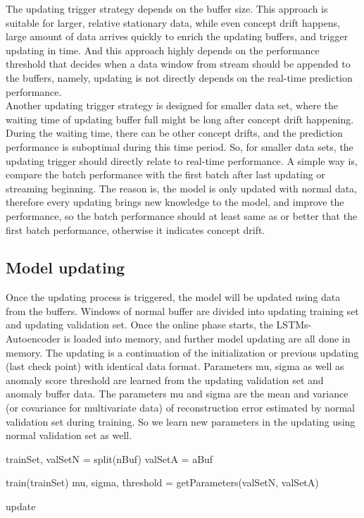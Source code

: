 The updating trigger strategy depends on the buffer size. This approach is suitable for larger, relative stationary data, while even concept drift happens, large amount of data arrives quickly to enrich the updating buffers, and trigger updating in time. And this approach highly depends on the performance threshold that decides when a data window from stream should be appended to the buffers, namely, updating is not directly depends on the real-time prediction performance. \\

Another updating trigger strategy is designed for smaller data set, where the waiting time of updating buffer full might be long after concept drift happening. During the waiting time, there can be other concept drifts, and the prediction performance is suboptimal during this time period. So, for smaller data sets, the updating trigger should directly relate to real-time performance. A simple way is, compare the batch performance with the first batch after last updating or streaming beginning. The reason is, the model is only updated with normal data, therefore every updating brings new knowledge to the model, and improve the performance, so the batch performance should at least same as or better that the first batch performance, otherwise it indicates concept drift.\\


\subsection{Model updating}
\label{updating}

Once the updating process is triggered, the model will be updated using data from the buffers. Windows of normal buffer are divided into updating training set and updating validation set. Once the online phase starts, the LSTMs-Autoencoder is loaded into memory, and further model updating are all done in memory. The updating is a continuation of the initialization or previous updating (last check point) with identical data format. Parameters mu, sigma as well as anomaly score threshold are learned from the updating validation set and anomaly buffer data. The parameters mu and sigma are the mean and variance (or covariance for multivariate data) of reconstruction error estimated by normal validation set during training. So we learn new parameters in the updating using normal validation set as well.

\begin{algorithm}[h]

\BlankLine 
trainSet, valSetN = split(nBuf)\;
valSetA = aBuf\;

train(trainSet)\;    
mu, sigma, threshold = getParameters(valSetN, valSetA)\;

\caption{update}
\label{alg:update}
\end{algorithm}




